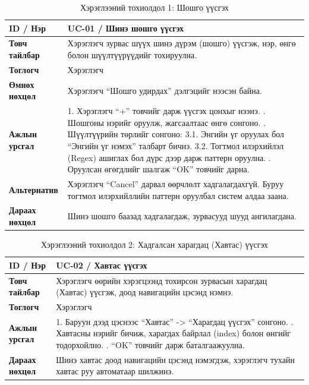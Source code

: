 \begin{longtable}{|l|p{10.5cm}|}
    \caption{Хэрэглээний тохиолдол 1: Шошго үүсгэх} \label{tab:uc_create_category} \\
    \hline
    \textbf{ID / Нэр} & UC-01 / Шинэ шошго үүсгэх \\ \hline
    \textbf{Товч тайлбар} & Хэрэглэгч зурвас шүүх шинэ дүрэм (шошго) үүсгэж, нэр, өнгө болон шүүлтүүрүүдийг тохируулна. \\ \hline
    \textbf{Тоглогч} & Хэрэглэгч \\ \hline
    \textbf{Өмнөх нөхцөл} & Хэрэглэгч ``Шошго удирдах'' дэлгэцийг нээсэн байна. \\ \hline
    \textbf{Ажлын урсгал} &
    1. Хэрэглэгч ``+'' товчийг дарж үүсгэх цонхыг нээнэ. \newline
    2. Шошгоны нэрийг оруулж, жагсаалтаас өнгө сонгоно. \newline
    3. Шүүлтүүрийн төрлийг сонгоно: \newline
    \hspace{0.5cm} 3.1. Энгийн үг оруулах бол ``Энгийн үг нэмэх'' талбарт бичнэ. \newline
    \hspace{0.5cm} 3.2. Тогтмол илэрхийлэл (Regex) ашиглах бол дүрс дээр дарж паттерн оруулна. \newline
    4. Оруулсан өгөгдлийг шалгаж ``OK'' товчийг дарна. \\ \hline
    \textbf{Альтернатив} & Хэрэглэгч ``Cancel'' дарвал өөрчлөлт хадгалагдахгүй. Буруу тогтмол илэрхийллийн паттерн оруулбал систем алдаа заана. \\ \hline
    \textbf{Дараах нөхцөл} & Шинэ шошго баазад хадгалагдаж, зурвасууд шууд ангилагдана. \\ \hline
\end{longtable}

\vspace{1em}

\begin{longtable}{|l|p{10.5cm}|}
    \caption{Хэрэглээний тохиолдол 2: Хадгалсан харагдац (Хавтас) үүсгэх} \label{tab:uc_create_folder} \\
    \hline
    \textbf{ID / Нэр} & UC-02 / Хавтас үүсгэх \\ \hline
    \textbf{Товч тайлбар} & Хэрэглэгч өөрийн хэрэгцээнд тохирсон зурвасын харагдац (Хавтас) үүсгэж, доод навигацийн цэсэнд нэмнэ. \\ \hline
    \textbf{Тоглогч } & Хэрэглэгч \\ \hline
    \textbf{Ажлын урсгал} &
    1. Баруун дээд цэснээс ``Хавтас'' -> ``Харагдац үүсгэх'' сонгоно. \newline
    2. Хавтасны нэрийг бичиж, харагдах байрлал (index) болон өнгийг тодорхойлно. \newline
    3. ``OK'' товчийг дарж баталгаажуулна. \\ \hline
    \textbf{Дараах нөхцөл} & Шинэ хавтас доод навигацийн цэсэнд нэмэгдэж, хэрэглэгч тухайн хавтас руу автоматаар шилжинэ. \\ \hline
\end{longtable}

